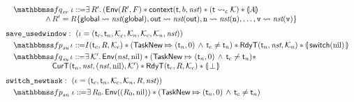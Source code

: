 \begin{figure}[!t]
\[\begin{array}{l}
            \\[-9pt]
            \quad
            \relspecpost_{\textit{rr}} \ \lgvl \define \exists \, \RFile'. \,  (\Env{\RFile', \Wstack}
            \sepstar \relcontext{\thrdid}{\block}{\nst} \sepstar 
            (\astCurCont{\thrdid}{\hthrdlocalst}) \sepstar \safePrimAst{\primcom} \\
            \hspace*{5em}
            \, \land \, 
            \RFile' = \RFile\{ \globalRN \rightsquigarrow \nst(\globalRN), 
                \outRN \rightsquigarrow \nst(\outRN), \regn \rightsquigarrow \nst(\regn), 
                \dots, \regv \rightsquigarrow \nst(\regv) \} \\
            \\[-5pt]
            \texttt{save\_usedwindow}: \ 
            (\lgvl = (\thrdid_c, \thrdid_n, \hthrdlocalst_c, \hthrdlocalst_n, 
                \hthrdlocalst_c, \hthrdlocalst_n, \nst)) \\
            \\[-9pt]
            \quad
            \relspecpre_{\textit{su}} \, \lgvl \define 
            I(\thrdid_c, \RFile, \hthrdlocalst_c) \sepstar 
            (\relmsto{\TaskNew}{(\thrdid_n, 0)} \, \land \, \thrdid_c \neq \thrdid_n) 
            \sepstar
            \RelRdyT{\thrdid_n}{\nst}{\hthrdlocalst_n} \sepstar 
            \safePrimAst{\, \primsw(\nil) \,} \\
            \\[-9pt]
            \quad
            \relspecpost_{\textit{su}} \, \lgvl \define 
            \exists \, \hthrdlocalst'. \, 
            \Env{\nst, \nil} \sepstar 
            (\relmsto{\TaskNew}{(\thrdid_n, 0)} \, \land \, \thrdid_c \neq \thrdid_n) \sepstar \\
            \hspace*{6em}
            \RelCurT{\thrdid_n}{\nst}{(\nst, \nil)}{\hthrdlocalst'} 
            \sepstar \RelRdyT{\thrdid_c}{\RFile}{\hthrdlocalst_c}
            \sepstar \safePrimAst{\, \primdone \,}
            \\
            \\[-5pt]
            \texttt{switch\_newtask}: \ (\lgvl = (\thrdid_c, \thrdid_n, \hthrdlocalst_c, 
            \hthrdlocalst_n, \RFile, \nst)) \\
            \\[-9pt]
            \quad 
            \relspecpre_{\textit{sn}} \ \lgvl \define 
            \exists \, \RFile_0. \, \Env{(\RFile_0, \nil)} \sepstar 
            (\relmsto{\TaskNew}{(\thrdid_n, 0)} \, \land \, \thrdid_c \neq \thrdid_n)

\end{array}\]
\end{figure}
